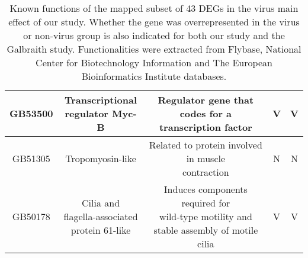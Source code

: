 \documentclass{bmcart}
\begin{document}
\begin{linenumbers}
\begin{backmatter}
\begin{table}[h!]
\begin{tabular}{ccccc}
\hline
GB53500 & \makecell{Transcriptional \\ regulator Myc-B} & \makecell{Regulator gene that codes for a \\ transcription factor} & V & V \\
\hline
GB51305 & Tropomyosin-like & \makecell{Related to protein involved in muscle \\ contraction} & N & N \\
\hline
GB50178 & \makecell{Cilia and \\ flagella-associated \\ protein 61-like} & \makecell{Induces components required for \\ wild-type motility and \\ stable assembly of motile cilia} & V & V \\
\hline
\end{tabular}
\caption{Known functions of the mapped subset of 43 DEGs in the virus main effect of our study. Whether the gene was overrepresented in the virus or non-virus group is also indicated for both our study and the Galbraith study. Functionalities were extracted from Flybase, National Center for Biotechnology Information and The European Bioinformatics Institute databases.}
  \label{tbl:virusGenes}
\end{table}


\end{backmatter}
\end{linenumbers}
\end{document}
